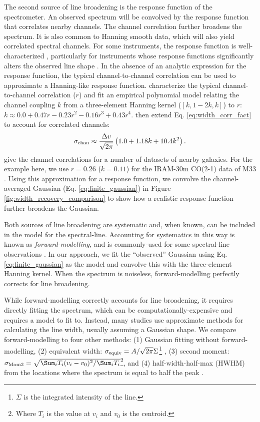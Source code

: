 \documentclass{rnaastex}
\begin{document}
The second source of line broadening is the response function of the spectrometer.  An observed spectrum will be convolved by the response function that correlates nearby channels.  The channel correlation further broadens the spectrum.  It is also common to Hanning smooth data, which will also yield correlated spectral channels.  For some instruments, the response function is well-characterized \citep{rosolowsky2008}, particularly for instruments whose response functions significantly alters the observed line shape \citep[e.g.][]{martin2015}.  In the absence of an analytic expression for the response function, the typical channel-to-channel correlation can be used to approximate a Hanning-like response function. \citet{leroy2016} characterize the typical channel-to-channel correlation ($r$) and fit an empirical polynomial model relating the channel coupling $k$ from a three-element Hanning kernel ($[k, 1 - 2k, k]$) to $r$: $k\approx 0.0 + 0.47r - 0.23r^2 - 0.16r^3 + 0.43 r^4$. \citet{leroy2016} then extend Eq. \ref{eq:width_corr_fact} to account for correlated channels:
\begin{equation}
    \label{eq:leroy16_corrfact}
    \sigma_{\rm chan} \approx \frac{\Delta v}{\sqrt{2\pi}} \left( 1.0 + 1.18k + 10.4 k^2 \right).
\end{equation}
\citet{sun2018} give the channel correlations for a number of \co datasets of nearby galaxies. For the example here, we use $r=0.26$ ($k=0.11$) for the IRAM-30m CO(2-1) data of M33 \citep{druard2014}.  Using this approximation for a response function, we convolve the channel-averaged Gaussian (Eq. \ref{eq:finite_gaussian}) in Figure \ref{fig:width_recovery_comparison} to show how a realistic response function further broadens the Gaussian.

Both sources of line broadening are systematic and, when known, can be included in the model for the spectral-line.  Accounting for systematics in this way is known as {\it forward-modelling}, and is commonly-used for some spectral-line observations \citep{rosolowsky2008,martin2015}.  In our approach, we fit the ``observed'' Gaussian using Eq. \ref{eq:finite_gaussian} as the model and convolve this with the three-element Hanning kernel.  When the spectrum is noiseless, forward-modelling perfectly corrects for line broadening. 

While forward-modelling correctly accounts for line broadening, it requires directly fitting the spectrum, which can be computationally-expensive and requires a model to fit to.  Instead, many studies use approximate methods for calculating the line width, usually assuming a Gaussian shape.  We compare forward-modelling to four other methods: (1) Gaussian fitting without forward-modelling, (2) equivalent width: $\sigma_{\rm equiv} = A / \sqrt{2\pi} \Sigma$\footnote{$\Sigma$ is the integrated intensity of the line.} \citep{heyer2001,leroy2016,sun2018}, (3) second moment: $\sigma_{\rm Mom2}=\sqrt{\Sum_i T_i (v_i - v_0)^2 / \Sum_i T_i}$\footnote{Where $T_i$ is the value at $v_i$ and $v_0$ is the centroid.}, and (4) half-width-half-max (HWHM) from the locations where the spectrum is equal to half the peak \citep{stilp2013a,stilp2013b,koch2018}.
\end{document}
